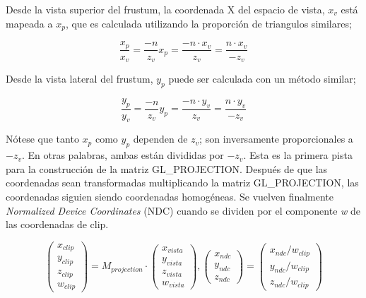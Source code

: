 Desde la vista superior del frustum, la coordenada X del espacio de vista, $x_v$ está mapeada a $x_p$, que es calculada utilizando la proporción de triangulos similares;
\begin{figure} [h]
  \centering
  \[
  \frac{x_p}{x_v} = \frac{-n}{z_v}
  x_p = \frac{-n \cdot x_v}{z_v} = \frac{n \cdot x_v}{-z_v}
  \]
\end{figure}

Desde la vista lateral del frustum, $y_p$ puede ser calculada con un método similar;

\begin{figure} [h]
  \centering
  \[ \frac{y_p}{y_v} = \frac{-n}{z_v}
  y_p = \frac{-n \cdot y_v}{z_v} = \frac{n \cdot y_v}{-z_v} \]
\end{figure}

\newpage
{}
Nótese que tanto $x_p$ como $y_p$ dependen de $z_v$; son inversamente proporcionales a $-z_v$. En otras palabras, ambas están divididas por $-z_v$. Esta es la primera pista para la construcción de la matriz GL\_PROJECTION. Después de que las coordenadas sean transformadas multiplicando la matriz GL\_PROJECTION, las coordenadas siguien siendo coordenadas homogéneas. Se vuelven finalmente \textit{Normalized Device Coordinates} (NDC) cuando se dividen por el componente \textit{w} de las coordenadas de clip.

\begin{figure} [h]
  \centering
  \[
  \begin{pmatrix}
    x_{clip} \\ y_{clip} \\ z_{clip} \\ w_{clip}
  \end{pmatrix}
  =
  M_{projection} \cdot
  \begin{pmatrix}
    x_{vista} \\ y_{vista} \\ z_{vista} \\ w_{vista}
  \end{pmatrix} ,
  \begin{pmatrix}
    x_{ndc} \\ y_{ndc} \\ z_{ndc}
  \end{pmatrix}
  =
  \begin{pmatrix}
    x_{ndc}/w_{clip} \\ y_{ndc}/w_{clip} \\ z_{ndc}/w_{clip}
  \end{pmatrix}
  \]
\end{figure}


